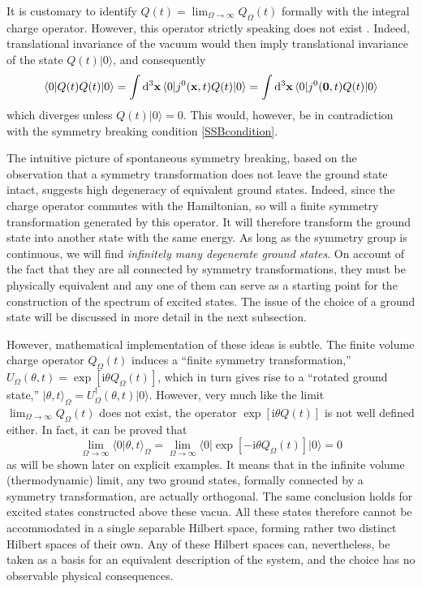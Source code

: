 \documentclass[final,3p,times,12pt,a4paper,sort&compress]{elsarticle}
\newcommand\vek[1]{{\boldsymbol{\bf #1}}}   %
\newcommand\bra[1]{\langle#1\vert}          %
\newcommand\ket[1]{\vert#1\rangle}          %
\newcommand\braket[2]{\langle#1\vert#2\rangle} %
\newcommand\he[1]{#1^{\dagger}}             %
\newcommand\imag{\mathrm i}                 %
\newcommand\vt{\theta}
\newcommand\dthree{\mathop{{\rm d}^3\!}\nolimits} %
\begin{document}
It is customary to identify $Q(t)=\lim_{\Omega\to\infty}Q_\Omega(t)$ formally
with the integral charge operator. However, this operator strictly speaking does
not exist \cite{Fabri:1966fp}. Indeed, translational invariance of the vacuum
would then imply translational invariance of the state $Q(t)\ket0$, and
consequently
\begin{equation}
\bra0Q(t)Q(t)\ket0=\int\dthree\vek x\,\bra0j^0(\vek x,t)Q(t)\ket0=
\int\dthree\vek x\,\bra0j^0(\vek0,t)Q(t)\ket0
\end{equation}
which diverges unless $Q(t)\ket0=0$. This would, however, be in contradiction
with the symmetry breaking condition \eqref{SSBcondition}.

The intuitive picture of spontaneous symmetry breaking, based on the
observation that a symmetry transformation does not leave the ground state
intact, suggests high degeneracy of equivalent ground states. Indeed, since
the charge operator commutes with the Hamiltonian, so will a finite symmetry
transformation generated by this operator. It will therefore transform the
ground state into another state with the same energy. As long as the symmetry
group is continuous, we will find \emph{infinitely many degenerate ground
states}. On account of the fact that they are all connected by symmetry
transformations, they must be physically equivalent and any one of them can
serve as a starting point for the construction of the spectrum of excited
states. The issue of the choice of a ground state will be discussed in more
detail in the next subsection.

However, mathematical implementation of these ideas is subtle. The finite
volume charge operator $Q_\Omega(t)$ induces a ``finite symmetry
transformation,'' $U_\Omega(\vt,t)=\exp[\imag\vt Q_\Omega(t)]$, which in turn
gives rise to a ``rotated ground state,'' $\ket{\vt,t}_\Omega=\he
U_\Omega(\vt,t)\ket0$. However, very much like the limit
$\lim_{\Omega\to\infty}Q_\Omega(t)$ does not exist, the operator $\exp[\imag\vt
Q(t)]$ is not well defined either. In fact, it can be proved that
\begin{equation}
\lim_{\Omega\to\infty}\braket0{\vt,t}_\Omega=\lim_{\Omega\to\infty}
\bra0\exp[-\imag\vt Q_\Omega(t)]\ket0=0
\end{equation}
as will be shown later on explicit examples. It means that in the infinite
volume (thermodynamic) limit, any two ground states, formally connected by a
symmetry transformation, are actually orthogonal. The same
conclusion holds for excited states constructed above these vacua. All these
states therefore cannot be accommodated in a single separable Hilbert space,
forming rather two distinct Hilbert spaces of their own. Any of these Hilbert
spaces can, nevertheless, be taken as a basis for an equivalent description of
the system, and the choice has no observable physical consequences.
\end{document}
